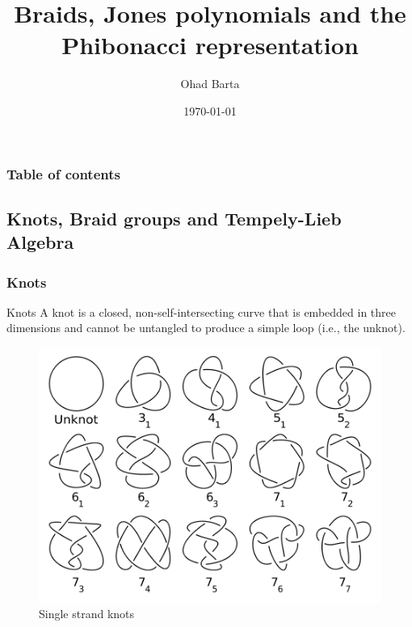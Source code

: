 \documentclass[leqno,fleqn]{beamer}
\begin{document}
\title{Braids, Jones polynomials and the Phibonacci representation} 
\author{Ohad Barta} 
\date{\today} 

\frame{\titlepage} 
\begin{frame}[allowframebreaks]
\frametitle{Table of contents}
{\tableofcontents}
\end{frame}

\subsection{Knots, Braid groups and Tempely-Lieb Algebra}
\subsubsection{Knots}

\begin{frame}{Knots}
A knot is a closed, non-self-intersecting curve that is embedded in three dimensions and cannot be untangled to produce a simple loop (i.e., the unknot). 

\begin{figure}
\centering
\includegraphics[scale=0.25]{470px-Knot_table}
\caption{Single strand knots}
\label{fig:my_label}
\end{figure}
\end{frame}

\end{document}
